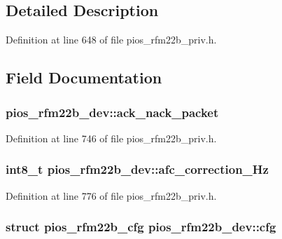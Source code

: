 \subsection{\-Detailed \-Description}


\-Definition at line 648 of file pios\-\_\-rfm22b\-\_\-priv.\-h.



\subsection{\-Field \-Documentation}
\hypertarget{structpios__rfm22b__dev_a57f8d0ab5171f50e634940b11cc402c1}{
\subsubsection[{ack\-\_\-nack\-\_\-packet}]{ {\bf pios\-\_\-rfm22b\-\_\-dev\-::ack\-\_\-nack\-\_\-packet}}}\label{structpios__rfm22b__dev_a57f8d0ab5171f50e634940b11cc402c1}


\-Definition at line 746 of file pios\-\_\-rfm22b\-\_\-priv.\-h.

\hypertarget{structpios__rfm22b__dev_a7ee3ea27898cb9341fcbfe9d4b7ad874}{
\subsubsection[{afc\-\_\-correction\-\_\-\-Hz}]{\setlength{\rightskip}{0pt plus 5cm}int8\-\_\-t {\bf pios\-\_\-rfm22b\-\_\-dev\-::afc\-\_\-correction\-\_\-\-Hz}}}\label{structpios__rfm22b__dev_a7ee3ea27898cb9341fcbfe9d4b7ad874}


\-Definition at line 776 of file pios\-\_\-rfm22b\-\_\-priv.\-h.

\hypertarget{structpios__rfm22b__dev_a2fc3047fbb17be7e546cab4e24ee2b28}{
\subsubsection[{cfg}]{\setlength{\rightskip}{0pt plus 5cm}struct {\bf pios\-\_\-rfm22b\-\_\-cfg} {\bf pios\-\_\-rfm22b\-\_\-dev\-::cfg}}}\label{structpios__rfm22b__dev_a2fc3047fbb17be7e546cab4e24ee2b28}


